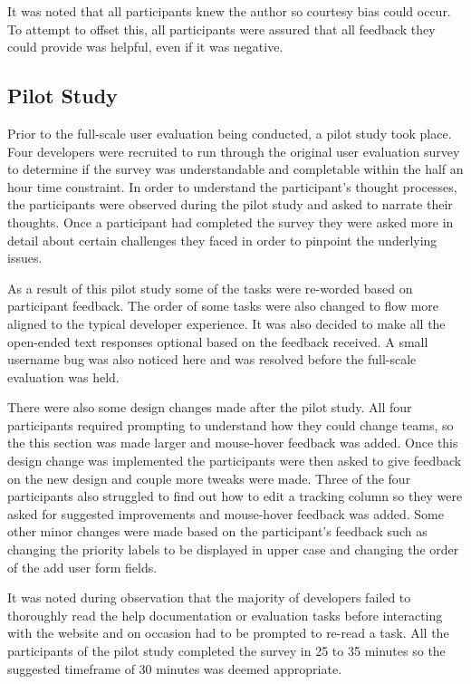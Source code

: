 \documentclass[l4proj.tex]{subfiles}
\begin{document}
It was noted that all participants knew the author so courtesy bias could occur. To attempt to offset this, all participants were assured that all feedback they could provide was helpful, even if it was negative.


\subsection{Pilot Study}
Prior to the full-scale user evaluation being conducted, a pilot study took place. Four developers were recruited to run through the original user evaluation survey to determine if the survey was understandable and completable within the half an hour time constraint. In order to understand the participant's thought processes, the participants were observed during the pilot study and asked to narrate their thoughts. Once a participant had completed the survey they were asked more in detail about certain challenges they faced in order to pinpoint the underlying issues. 

As a result of this pilot study some of the tasks were re-worded based on participant feedback. The order of some tasks were also changed to flow more aligned to the typical developer experience. It was also decided to make all the open-ended text responses optional based on the feedback received. A small username bug was also noticed here and was resolved before the full-scale evaluation was held.

There were also some design changes made after the pilot study. All four participants required prompting to understand how they could change teams, so the this section was made larger and mouse-hover feedback was added. Once this design change was implemented the participants were then asked to give feedback on the new design and couple more tweaks were made. Three of the four participants also struggled to find out how to edit a tracking column so they were asked for suggested improvements and mouse-hover feedback was added. Some other minor changes were made based on the participant's feedback such as changing the priority labels to be displayed in upper case and changing the order of the add user form fields.

It was noted during observation that the majority of developers failed to thoroughly read the help documentation or evaluation tasks before interacting with the website and on occasion had to be prompted to re-read a task. All the participants of the pilot study completed the survey in 25 to 35 minutes so the suggested timeframe of 30 minutes was deemed appropriate.
\end{document}
